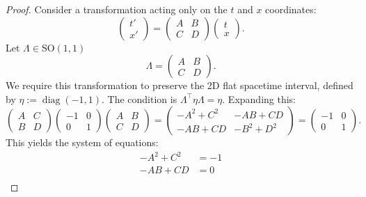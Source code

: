 \documentclass{amsart}
\theoremstyle{definition}
\theoremstyle{remark}
\DeclareMathOperator{\diag}{diag}
\begin{document}
\begin{proof}
  Consider a transformation acting only on the $t$ and $x$ coordinates:
  \begin{equation*}
    \begin{pmatrix}
      t' \\
      x'
    \end{pmatrix} =
    \begin{pmatrix}
      A & B \\
      C & D
    \end{pmatrix}
    \begin{pmatrix}
      t \\
      x
    \end{pmatrix}.
  \end{equation*}
  Let $\Lambda\in\mathrm{SO}(1,1)$
  \begin{equation*}
    \Lambda =
    \begin{pmatrix}
      A & B \\
      C & D
    \end{pmatrix}.
  \end{equation*}
  We require this transformation to preserve the 2D flat spacetime interval, defined by $\eta := \diag(-1, 1)$.
  The condition is $\Lambda^\top \eta \Lambda = \eta$.
  Expanding this:
  \begin{equation*}
    \begin{pmatrix}
      A & C \\
      B & D
    \end{pmatrix}
    \begin{pmatrix}
      -1 & 0 \\
      0 & 1
    \end{pmatrix}
    \begin{pmatrix}
      A & B \\
      C & D
    \end{pmatrix}
    =
    \begin{pmatrix}
      -A^2 + C^2 & -AB + CD \\
      -AB + CD & -B^2 + D^2
    \end{pmatrix}
    =
    \begin{pmatrix}
      -1 & 0 \\ 0 & 1
    \end{pmatrix}.
  \end{equation*}
  This yields the system of equations:
  \begin{align*}
    -A^2 + C^2 &= -1  \\
    -AB + CD &= 0  \\

\end{align*}
\end{proof}
\end{document}
